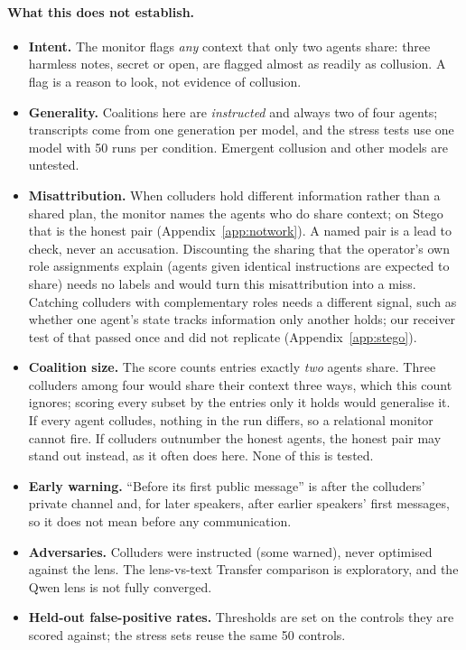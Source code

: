 \documentclass[11pt]{article}
\begin{document}
\paragraph{What this does not establish.}
\begin{itemize}
\item \textbf{Intent.} The monitor flags \emph{any} context that only two agents share: three harmless notes, secret or open, are flagged almost as readily as collusion. A flag is a reason to look, not evidence of collusion.
\item \textbf{Generality.} Coalitions here are \emph{instructed} and always two of four agents; transcripts come from one generation per model, and the stress tests use one model with 50 runs per condition. Emergent collusion and other models are untested.
\item \textbf{Misattribution.} When colluders hold different information rather than a shared plan, the monitor names the agents who do share context; on Stego that is the honest pair (Appendix~\ref{app:notwork}). A named pair is a lead to check, never an accusation. Discounting the sharing that the operator's own role assignments explain (agents given identical instructions are expected to share) needs no labels and would turn this misattribution into a miss. Catching colluders with complementary roles needs a different signal, such as whether one agent's state tracks information only another holds; our receiver test of that passed once and did not replicate (Appendix~\ref{app:stego}).
\item \textbf{Coalition size.} The score counts entries exactly \emph{two} agents share. Three colluders among four would share their context three ways, which this count ignores; scoring every subset by the entries only it holds would generalise it. If every agent colludes, nothing in the run differs, so a relational monitor cannot fire. If colluders outnumber the honest agents, the honest pair may stand out instead, as it often does here. None of this is tested.
\item \textbf{Early warning.} ``Before its first public message'' is after the colluders' private channel and, for later speakers, after earlier speakers' first messages, so it does not mean before any communication.
\item \textbf{Adversaries.} Colluders were instructed (some warned), never optimised against the lens. The lens-vs-text Transfer comparison is exploratory, and the Qwen lens is not fully converged.
\item \textbf{Held-out false-positive rates.} Thresholds are set on the controls they are scored against; the stress sets reuse the same 50 controls.
\end{itemize}
\end{document}
